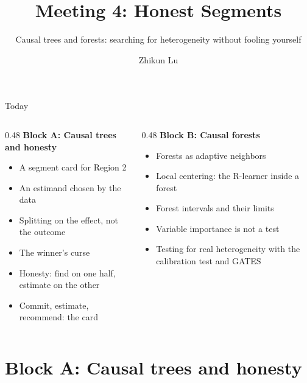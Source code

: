 \documentclass[aspectratio=169, 11pt, handout]{beamer}
\title[Meeting 4]{Meeting 4: Honest Segments}
\subtitle{Causal trees and forests: searching for heterogeneity without fooling yourself}
\author{Zhikun Lu}
\date{}
\begin{document}
\begin{frame}
\titlepage
\end{frame}

\begin{frame}{Today}

\begin{columns}[T]
\begin{column}{0.48\textwidth}
\textbf{Block A: Causal trees and honesty}
\begin{itemize}
  \item A segment card for Region 2
  \item An estimand chosen by the data
  \item Splitting on the effect, not the outcome
  \item The winner's curse
  \item Honesty: find on one half, estimate on the other
  \item Commit, estimate, recommend: the card
\end{itemize}
\end{column}
\begin{column}{0.48\textwidth}
\textbf{Block B: Causal forests}
\begin{itemize}
  \item Forests as adaptive neighbors
  \item Local centering: the R-learner inside a forest
  \item Forest intervals and their limits
  \item Variable importance is not a test
  \item Testing for real heterogeneity with the calibration test and GATES
\end{itemize}
\end{column}
\end{columns}
\end{frame}

\section{Block A: Causal trees and honesty}
\end{document}
